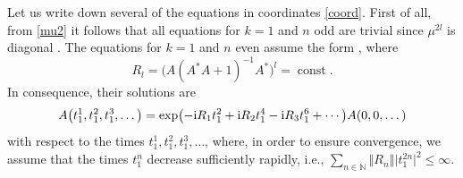 \documentclass[10pt,a4paper]{amsart}
\theoremstyle{definition}
\numberwithin{equation}{section}
\newcommand{\norm}[1]{\left\Vert#1\right\Vert}
\newcommand{\N}{\mathbb N}
\DeclareMathOperator{\const}{const}
\begin{document}
Let us write down several of the equations in coordinates \eqref{coord}. First of all, from \eqref{mu2} it follows that all equations for $k=1$ and $n$ odd are trivial since $\mu^{2l}$ is diagonal
.
The equations for $k=1$ and $n$ even assume the form
,
where
\[ R_l = \bigl(A (A^* A+1)^{-1} A^*\bigr)^l = \const. \]
In consequence, their solutions are
\[ A\bigl(t_1^1,t_1^2,t_1^3,\dots\bigr)= \exp\bigl(-{\rm i}R_{1}{t_1^2}+
{\rm i}R_{2}{t_1^4}-{\rm i}R_{3}{t_1^6}+\cdots\bigr) A(0,0,\dots) \]
with respect to the times $t_1^1,t_1^2,t_1^3,\dots$, where, in order to ensure convergence, we assume that the times $t^n_1$ decrease sufficiently rapidly, i.e.,
$\sum_{n\in\N} \norm{R_n} \bigl|t^{2n}_1\bigr|^2 \leq \infty$.
\end{document}

